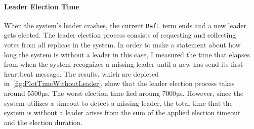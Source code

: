 
\paragraph{Leader Election Time}
When the system's leader crashes, the current \texttt{Raft} term ends and a new leader gets elected.
The leader election process consists of requesting and collecting votes from all replicas in the system.
In order to make a statement about how long the system is without a leader in this case, I measured the time that elapses from when the system recognizes a missing leader until a new has send its first heartbeat message.
The results, which are depicted in~\autoref{fig:PlotTimeWithoutLeader}, show that the leader election process takes around 5500µs.
The worst election time lied aroung 7000µs.
However, since the system utilizes a timeout to detect a missing leader, the total time that the system is without a leader arises from the sum of the applied election timeout and the election duration.

